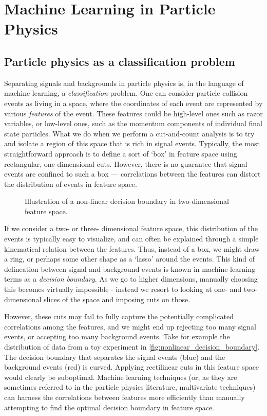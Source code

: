 \chapter{Machine Learning in Particle Physics}\label{ch:MachineLearning}
\section{Particle physics as a classification problem}
Separating signals and backgrounds in particle physics is, in the language of machine learning, a \emph{classification} problem. One can consider particle collision events as living in a space, where the coordinates of each event are represented by various \emph{features} of the event. These features could be high-level ones such as razor variables, or low-level ones, such as the momentum components of individual final state particles. What we do when we perform a cut-and-count analysis is to try and isolate a region of this space that is rich in signal events. Typically, the most straightforward approach is to define a sort of `box' in feature space using rectangular, one-dimensional cuts. However, there is no guarantee that signal events are confined to such a box --- correlations between the features can distort the distribution of events in feature space. 
\strictpagecheck
\begin{figure}
  \begin{sidecaption}{Illustration of a non-linear decision boundary in two-dimensional feature space.}
  
\end{sidecaption}
\label{fig:nonlinear_decision_boundary}
\end{figure}
If we consider a two- or three- dimensional feature space, this distribution of the events is typically easy to visualize, and can often be explained through a simple kinematical relation between the features. Thus, instead of a box, we might draw a ring, or perhaps some other shape as a `lasso' around the events. This kind of delineation between signal and background events is known in machine learning terms as a \emph{decision boundary}. As we go to higher dimensions, manually choosing this becomes virtually impossible - instead we resort to looking at one- and two-dimensional slices of the space and imposing cuts on those. 

However, these cuts may fail to fully capture the potentially complicated correlations among the features, and we might end up rejecting too many signal events, or accepting too many background events. Take for example the distribution of data from a toy experiment in \autoref{fig:nonlinear_decision_boundary}. The decision boundary that separates the signal events (blue) and the background events (red) is curved. Applying rectilinear cuts in this feature space would clearly be suboptimal. Machine learning techniques (or, as they are sometimes referred to in the particle physics literature, multivariate techniques) can harness the correlations between features more efficiently than manually attempting to find the optimal decision boundary in feature space.

